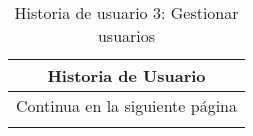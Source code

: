 

\begin{longtable}{|p{6.7cm}|p{6.7cm}|}
    \caption{Historia de usuario 3: Gestionar usuarios} \label{tab:historia-3}
    \\
    \hline
    \multicolumn{2}{|c|}{\textbf{Historia de Usuario}}                                                                                                          \\
    \hline

    \endfirsthead

    \hline
    \endhead

    \hline
    \multicolumn{2}{|c|}{{Continua en la siguiente página}}                                                                                                     \\
    \hline
    \endfoot

    \hline
    \endlastfoot


\end{longtable}
